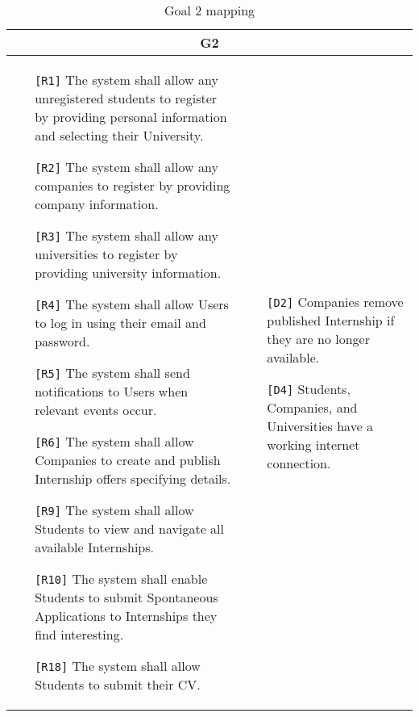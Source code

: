 \begin{table}[H]
    \centering
    \begin{tabular}{|p{8cm}|p{8cm}|}
         \hline
        \multicolumn{2}{|c|}{G2} \\
        \hline
        \begin{itemize}
            \item[\texttt{[R1]}] The system shall allow any unregistered students to register by providing personal information and selecting their University.
            \item[\texttt{[R2]}] The system shall allow any companies to register by providing company information.
            \item[\texttt{[R3]}] The system shall allow any universities to register by providing university information.
            \item[\texttt{[R4]}] The system shall allow Users to log in using their email and password.
            \item[\texttt{[R5]}] The system shall send notifications to Users when relevant events occur.
            \item[\texttt{[R6]}] The system shall allow Companies to create and publish Internship offers specifying details.
            \item[\texttt{[R9]}] The system shall allow Students to view and navigate all available Internships.
            \item[\texttt{[R10]}] The system shall enable Students to submit Spontaneous Applications to Internships they find interesting.
            \item[\texttt{[R18]}] The system shall allow Students to submit their CV.
            
        \end{itemize} & 
        \begin{itemize}
            \item[\texttt{[D2]}] Companies remove published Internship if they are no longer available.
            \item[\texttt{[D4]}] Students, Companies, and Universities have a working internet connection.
        \end{itemize} \\ \hline
    \end{tabular}
    \caption{Goal 2 mapping}
    \label{tab:G2}
\end{table}

